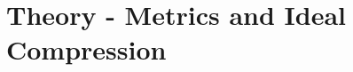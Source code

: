 \documentclass[../main2.tex]{subfiles}
\providecommand{\rootdir}{..}
\begin{document}
\FloatBarrier
\section{Theory - Metrics and Ideal Compression} \label{theory_metrics_ideal}




\end{document}
